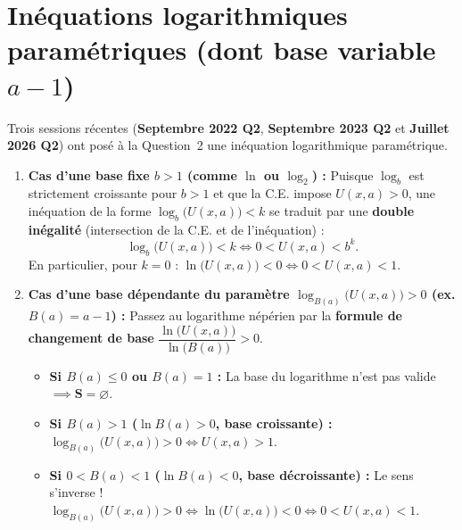 \section{Inéquations logarithmiques paramétriques (dont base variable $a - 1$)}

Trois sessions récentes (\textbf{Septembre 2022 Q2}, \textbf{Septembre 2023 Q2} et \textbf{Juillet 2026 Q2}) ont posé à la Question~2 une inéquation logarithmique paramétrique.

\begin{theoreme}
\begin{enumerate}
    \item \textbf{Cas d'une base fixe $b > 1$ (comme $\ln$ ou $\log_2$) :}
    Puisque $\log_b$ est strictement croissante pour $b > 1$ et que la C.E. impose $U(x, a) > 0$, une inéquation de la forme $\log_b\bigl(U(x, a)\bigr) < k$ se traduit par une \textbf{double inégalité} (intersection de la C.E. et de l'inéquation) :
    \[
        \boxed{\log_b\bigl(U(x, a)\bigr) < k \iff 0 < U(x, a) < b^k}.
    \]
    En particulier, pour $k = 0$ : $\boxed{\ln\bigl(U(x,a)\bigr) < 0 \iff 0 < U(x, a) < 1}$.
    \item \textbf{Cas d'une base dépendante du paramètre $\log_{B(a)}\bigl(U(x, a)\bigr) > 0$ (ex. $B(a) = a - 1$) :}
    Passez au logarithme népérien par la \textbf{formule de changement de base} $\dfrac{\ln\bigl(U(x,a)\bigr)}{\ln\bigl(B(a)\bigr)} > 0$.
    \begin{itemize}
        \item \textbf{Si $B(a) \le 0$ ou $B(a) = 1$ :} La base du logarithme n'est pas valide $\implies \mathbf{S = \varnothing}$.
        \item \textbf{Si $B(a) > 1$ ($\ln B(a) > 0$, base croissante) :} $\log_{B(a)}\bigl(U(x,a)\bigr) > 0 \iff \boxed{U(x, a) > 1}$.
        \item \textbf{Si $0 < B(a) < 1$ ($\ln B(a) < 0$, base décroissante) :} Le sens s'inverse ! $\log_{B(a)}\bigl(U(x,a)\bigr) > 0 \iff \ln\bigl(U(x,a)\bigr) < 0 \iff \boxed{0 < U(x, a) < 1}$.
    \end{itemize}
\end{enumerate}
\end{theoreme}

